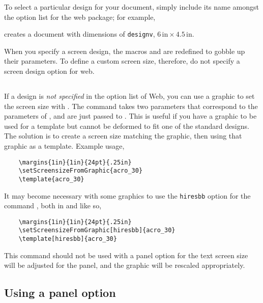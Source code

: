 \documentclass{article}
\def\Web{\textsf{Web}}
\def\CMD#1{\textbackslash#1}
\begin{document}
\newtopic To select a particular design for your document, simply include its name amongst the option
list for the web package; for example,
\begin{sverbatim}
    \usepackage[designv,pdftex]{web}
\end{sverbatim}
\noindent creates a document with dimensions of \texttt{designv},  $6\,\text{in} \times 4.5\,\text{in}$.

\redpoint When you specify a screen design, the macros
 and  are redefined to gobble up
their parameters. To define a custom screen size, therefore, do
not specify a screen design option for \textsf{web}.

\subsection{\texorpdfstring{\protect{}}{\CMD{setScreensizeFromGraphic}}}\label{setScreensizeFromGraphic}

If a design is \emph{not specified} in the option list of \Web, you
can use a graphic to set the screen size with
. The command takes two parameters
that correspond to the parameters of , and are
just passed to . This is useful if you have a
graphic to be used for a template but cannot be deformed to fit one
of the standard designs. The solution is to create a screen size
matching the graphic, then using that graphic as a template. Example
usage,
\begin{verbatim}
    \margins{1in}{1in}{24pt}{.25in}
    \setScreensizeFromGraphic{acro_30}
    \template{acro_30}
\end{verbatim}
It may become necessary with some graphics to use the
\texttt{hiresbb} option for the command , both in
 and  like so,
\begin{verbatim}
    \margins{1in}{1in}{24pt}{.25in}
    \setScreensizeFromGraphic[hiresbb]{acro_30}
    \template[hiresbb]{acro_30}
\end{verbatim}
\newtopic This command should not be used with a panel option for the text screen
size will be adjusted for the panel, and the graphic will be
rescaled appropriately.


\subsection{Using a panel option}
\end{document}
